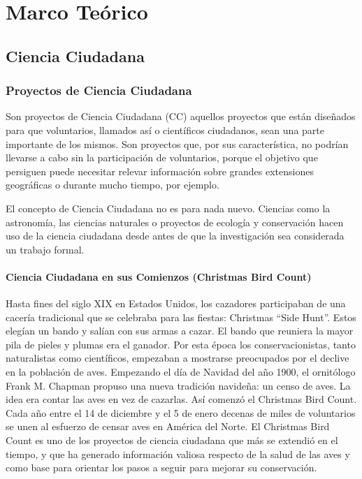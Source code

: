\chapter{Marco Teórico}
\section{Ciencia Ciudadana}
		
	
\subsection{Proyectos de Ciencia Ciudadana}

	Son proyectos de Ciencia Ciudadana (CC) aquellos proyectos que están diseñados para que voluntarios, llamados así o científicos ciudadanos, sean una parte importante de los mismos. Son proyectos que, por sus característica, no podrían llevarse a cabo sin la participación de voluntarios, porque el objetivo que persiguen puede necesitar relevar información sobre grandes extensiones geográficas o durante mucho tiempo, por ejemplo. \cite{bonney2009citizen}
	
	
	
	El concepto de Ciencia Ciudadana no es para nada nuevo. Ciencias como la astronomía, las ciencias naturales o proyectos de ecología y conservación hacen uso de la ciencia ciudadana desde antes de que la investigación sea considerada un trabajo formal. \cite{silvertown2009new}

\subsubsection{Ciencia Ciudadana en sus Comienzos (Christmas Bird Count)}
	Hasta fines del siglo XIX en Estados Unidos, los cazadores participaban de una cacería tradicional que se celebraba para las fiestas: Christmas ``Side Hunt''. Estos elegían un bando y salían con sus armas a cazar. El bando que reuniera la mayor pila de pieles y plumas era el ganador. Por esta época los conservacionistas, tanto naturalistas como científicos, empezaban a mostrarse preocupados por el declive en la población de aves. Empezando el día de Navidad del año 1900, el ornitólogo Frank M. Chapman propuso una nueva tradición navideña: un censo de aves. La idea era contar las aves en vez de cazarlas. Así comenzó el Christmas Bird Count. Cada año entre el 14 de diciembre y el 5 de enero decenas de miles de voluntarios se unen al esfuerzo de censar aves en América del Norte. El Christmas Bird Count es uno de los proyectos de ciencia ciudadana que más se extendió en el tiempo, y que ha generado información valiosa respecto de la salud de las aves y como base para orientar los pasos a seguir para mejorar su conservación. \cite{CBC}
	
